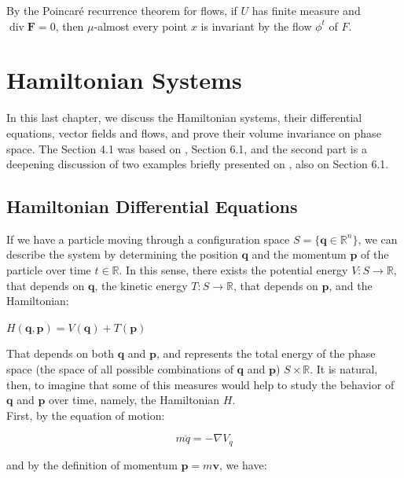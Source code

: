\documentclass[a4paper,12pt] {article}
\begin{document}
 By the Poincaré recurrence theorem for flows, if $U$ has finite measure and $\operatorname{div} \textbf{F} = 0$, then $\mu$-almost every point $x$ is invariant by the flow $\phi^t$ of $F$.

\section{Hamiltonian Systems}

In this last chapter, we discuss the Hamiltonian systems, their differential equations, vector fields and flows, and prove their volume invariance on phase space. The Section 4.1 was based  on \cite{Robinson}, Section 6.1, and the second part is a deepening discussion of two examples briefly presented on \cite{Robinson}, also on Section 6.1.

\subsection{Hamiltonian Differential Equations}

If we have a particle moving through a configuration space $S = \{\mathbf{q} \in \mathbb{R}^n\}$, we can describe the system by determining the position $\mathbf{q}$ and the momentum $\mathbf{p}$ of the particle over time $t \in \mathbb{R}$. In this sense, there exists the potential energy $V : S \to \mathbb{R}$, that depends on $\mathbf{q}$, the kinetic energy $T : S \to \mathbb{R}$, that depends on $\mathbf{p}$, and the Hamiltonian:

\begin{center}
    $H(\mathbf{q},\mathbf{p}) = V(\mathbf{q}) + T(\mathbf{p})$
\end{center}

 That depends on both $\mathbf{q}$ and $\mathbf{p}$, and represents the total energy of the phase space (the space of all possible combinations of $\mathbf{q}$ and $\mathbf{p}$) $S \times \mathbb{R}$. It is natural, then, to imagine that some of this measures would help to study the behavior of $\mathbf{q}$ and $\mathbf{p}$ over time, namely, the Hamiltonian $H$.\\

 First, by the equation of motion:

\begin{equation}
    m\ddot{q} = -\nabla V_q
\end{equation}

\noindent and by the definition of momentum $\mathbf{p} = m\mathbf{v}$, we have:
\end{document}
